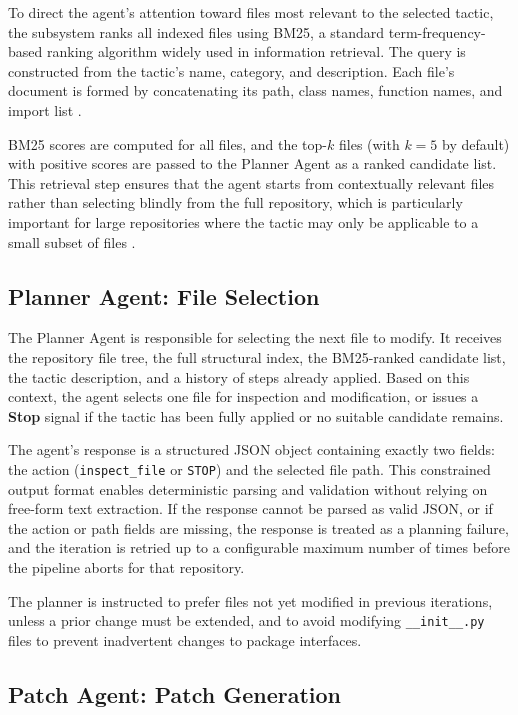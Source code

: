 To direct the agent's attention toward files most relevant to the selected tactic, the subsystem ranks all indexed files using BM25, a standard term-frequency-based ranking algorithm widely used in information retrieval. The query is constructed from the tactic's name, category, and description. Each file's document is formed by concatenating its path, class names, function names, and import list \cite{robertson2009probabilistic}.

BM25 scores are computed for all files, and the top-$k$ files (with $k = 5$ by default) with positive scores are passed to the Planner Agent as a ranked candidate list. This retrieval step ensures that the agent starts from contextually relevant files rather than selecting blindly from the full repository, which is particularly important for large repositories where the tactic may only be applicable to a small subset of files \cite{robertson2009probabilistic}.

\subsection{Planner Agent: File Selection}
\label{subsec:impl_planner}

The Planner Agent is responsible for selecting the next file to modify. It receives the repository file tree, the full structural index, the BM25-ranked candidate list, the tactic description, and a history of steps already applied. Based on this context, the agent selects one file for inspection and modification, or issues a \textbf{Stop} signal if the tactic has been fully applied or no suitable candidate remains.

The agent's response is a structured JSON object containing exactly two fields: the action (\texttt{inspect\_file} or \texttt{STOP}) and the selected file path. This constrained output format enables deterministic parsing and validation without relying on free-form text extraction. If the response cannot be parsed as valid JSON, or if the action or path fields are missing, the response is treated as a planning failure, and the iteration is retried up to a configurable maximum number of times before the pipeline aborts for that repository.

The planner is instructed to prefer files not yet modified in previous iterations, unless a prior change must be extended, and to avoid modifying \texttt{\_\_init\_\_.py} files to prevent inadvertent changes to package interfaces.

\subsection{Patch Agent: Patch Generation}
\label{subsec:impl_patch}


